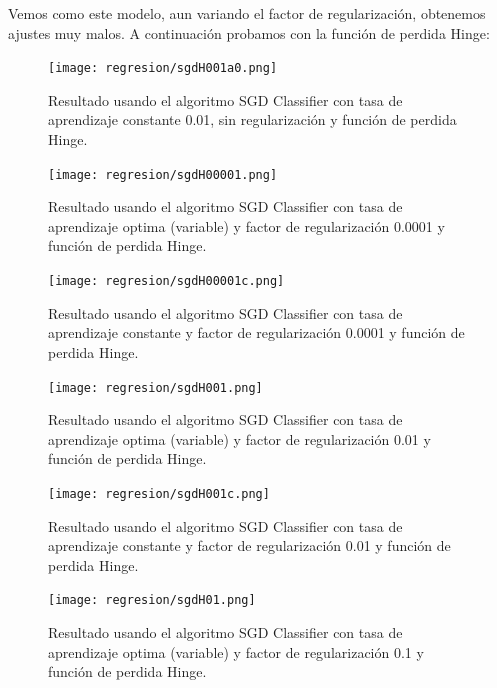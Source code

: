 \documentclass[12pt, spanish]{article}
\begin{document}
\newpage

Vemos como este modelo, aun variando el factor de regularización, obtenemos ajustes muy malos. A continuación probamos con la función de perdida Hinge:

\begin{figure}[H]
	\centering
	\hspace*{-1cm}\texttt{[image: regresion/sgdH001a0.png]}
	\caption{Resultado usando el algoritmo SGD Classifier con tasa de aprendizaje constante 0.01, sin regularización y función de perdida Hinge.}
	\label{SGDL0}
\end{figure}

\begin{figure}[H]
	\centering
	\hspace*{-1cm}\texttt{[image: regresion/sgdH00001.png]}
	\caption{Resultado usando el algoritmo SGD Classifier con tasa de aprendizaje optima (variable) y factor de regularización 0.0001 y función de perdida Hinge.}
	\label{SGDL00001}
\end{figure}

\begin{figure}[H]
	\centering
	\hspace*{-1cm}\texttt{[image: regresion/sgdH00001c.png]}
	\caption{Resultado usando el algoritmo SGD Classifier con tasa de aprendizaje constante y factor de regularización 0.0001 y función de perdida Hinge.}
	\label{SGDL00001}
\end{figure}

\begin{figure}[H]
	\centering
	\hspace*{-1cm}\texttt{[image: regresion/sgdH001.png]}
	\caption{Resultado usando el algoritmo SGD Classifier con tasa de aprendizaje optima (variable) y factor de regularización 0.01 y función de perdida Hinge.}
	\label{SGDL001}
\end{figure}

\begin{figure}[H]
	\centering
	\hspace*{-1cm}\texttt{[image: regresion/sgdH001c.png]}
	\caption{Resultado usando el algoritmo SGD Classifier con tasa de aprendizaje constante y factor de regularización 0.01 y función de perdida Hinge.}
	\label{SGDL001}
\end{figure}


\begin{figure}[H]
	\centering
	\hspace*{-1cm}\texttt{[image: regresion/sgdH01.png]}
	\caption{Resultado usando el algoritmo SGD Classifier con tasa de aprendizaje optima (variable) y factor de regularización 0.1 y función de perdida Hinge.}
	\label{SGDL001}
\end{figure}
\end{document}
